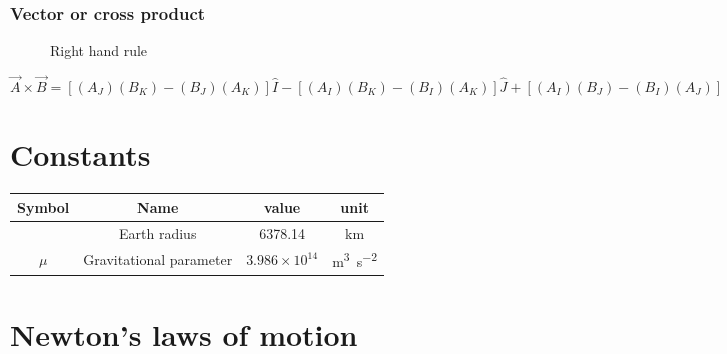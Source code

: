 \documentclass{article}
\begin{document}
\subsubsection*{Vector or cross product}
	\begin{figure}[H]
		\centering
		\caption{Right hand rule}
		\label{fig:right_hand_rule}
	\end{figure}

	\begin{equation*}
	\boxed{\vec{A} \times \vec{B} = [(A_J)(B_K)-(B_J)(A_K)]\hat{I} - [(A_I)(B_K) - (B_I)(A_K)]\hat{J} + [(A_I)(B_J)-(B_I)(A_J)]}
	\end{equation*}

\section{Constants}
\begin{center}
	\begin{tabular}{|c | c |  c | c |} 
		\hline
		Symbol & Name & value & unit \\ [0.5ex] 
		\hline\hline
		& Earth radius & 6378.14 & km \\ 
		\hline
		$\mu$ & Gravitational parameter & $3.986 \times 10^{14}$ & \si{\meter\cubed\per\second\squared} \\ 
		\hline
	\end{tabular}
\end{center}

\section{Newton's laws of motion}
\end{document}
